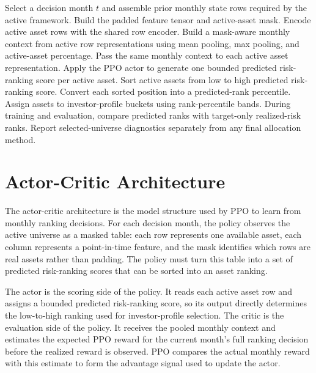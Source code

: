 \begin{algorithm}[H]
\caption{Monthly PPO risk scoring and investor-bucket construction}
\label{alg:monthly_scoring}
\begin{algorithmic}[1]
\STATE Select a decision month \(t\) and assemble prior monthly state rows required by the active framework.
\STATE Build the padded feature tensor and active-asset mask.
\STATE Encode active asset rows with the shared row encoder.
\STATE Build a mask-aware monthly context from active row representations using mean pooling, max pooling, and active-asset percentage.
\STATE Pass the same monthly context to each active asset representation.
\STATE Apply the PPO actor to generate one bounded predicted risk-ranking score per active asset.
\STATE Sort active assets from low to high predicted risk-ranking score.
\STATE Convert each sorted position into a predicted-rank percentile.
\STATE Assign assets to investor-profile buckets using rank-percentile bands.
\STATE During training and evaluation, compare predicted ranks with target-only realized-risk ranks.
\STATE Report selected-universe diagnostics separately from any final allocation method.
\end{algorithmic}
\end{algorithm}

\section{Actor-Critic Architecture}
\label{sec:actor_critic}

The actor-critic architecture is the model structure used by PPO to learn from monthly ranking decisions. For each decision month, the policy observes the active universe as a masked table: each row represents one available asset, each column represents a point-in-time feature, and the mask identifies which rows are real assets rather than padding. The policy must turn this table into a set of predicted risk-ranking scores that can be sorted into an asset ranking.

The actor is the scoring side of the policy. It reads each active asset row and assigns a bounded predicted risk-ranking score, so its output directly determines the low-to-high ranking used for investor-profile selection. The critic is the evaluation side of the policy. It receives the pooled monthly context and estimates the expected PPO reward for the current month's full ranking decision before the realized reward is observed. PPO compares the actual monthly reward with this estimate to form the advantage signal used to update the actor.

